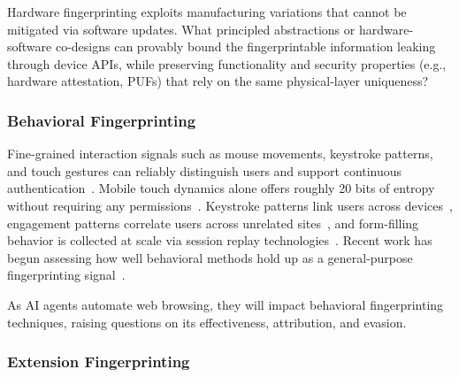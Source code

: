\begin{opbox}
Hardware fingerprinting exploits manufacturing variations that cannot be mitigated via software updates. What principled abstractions or hardware-software co-designs can provably bound the fingerprintable information leaking through device APIs, while preserving functionality and security properties (e.g., hardware attestation, PUFs) that rely on the same physical-layer uniqueness?
\end{opbox}


\subsubsection{Behavioral Fingerprinting} 
\label{sec:stateless-techniques-behavioral-fingperinting}

Fine-grained interaction signals such as mouse movements, keystroke patterns, and touch gestures can reliably distinguish users and support continuous authentication~\cite{attererKnowingUsersEvery2006,zhengEfficientUserVerification2011,leivaMyMouseMy2021,fereidooniAuthentiSenseScalableBehavioral2023}.
Mobile touch dynamics alone offers roughly 20 bits of entropy without requiring any permissions~\cite{masoodTouchYoureTrappcked2018}.
%
%
Keystroke patterns link users across devices~\cite{yuanCrossdeviceTrackingIdentification2018}, engagement patterns correlate users across unrelated sites~\cite{gogaExploitingInnocuousActivity2013}, and form-filling behavior is collected at scale via session replay technologies~\cite{linFillBlanksEmpirical2020,cuiUnderstandingPrivacyNorms2025,acarNoBoundariesData2020}.
%
Recent work has begun assessing how well behavioral methods hold up as a general-purpose fingerprinting signal~\cite{crichtonRethinkingFingerprintingAssessment2025}.

\begin{opbox}
As AI agents automate web browsing, they will impact behavioral fingerprinting techniques, raising questions on its effectiveness, attribution, and evasion.
\end{opbox}


\subsubsection{Extension Fingerprinting} 
\label{sec:stateless-techniques-extension-fingperinting}

